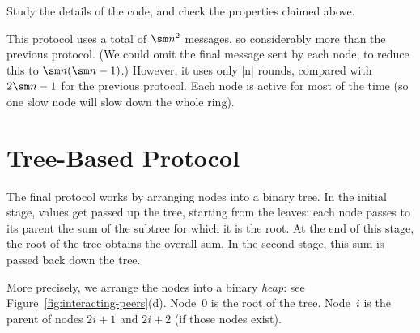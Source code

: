 \begin{instruction}
Study the details of the code, and check the properties claimed above.
\end{instruction}

This protocol uses a total of $\sm n^2$ messages, so considerably more than
the previous protocol.  (We could omit the final message sent by each node, to
reduce this to $\sm n(\sm n - 1)$.)  However, it uses only |n| rounds,
compared with $2\sm n-1$ for the previous protocol.  Each node is active for
most of the time (so one slow node will slow down the whole ring).


\section{Tree-Based Protocol}

The final protocol works by arranging nodes into a binary tree.  In the
initial stage, values get passed up the tree, starting from the leaves: each
node passes to its parent the sum of the subtree for which it is the root.  At
the end of this stage, the root of the tree obtains the overall sum.  In the
second stage, this sum is passed back down the tree.

More precisely, we arrange the nodes into a binary \emph{heap}: see
Figure~\ref{fig:interacting-peers}(d).  Node~$0$ is the root of the tree.
Node~$i$ is the parent of nodes $2i+1$ and $2i+2$ (if those nodes exist).




